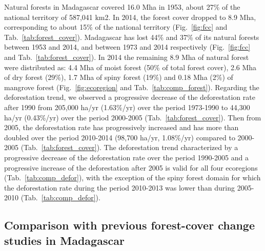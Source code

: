 \documentclass[a4paper, 12pt, leqno]{article} %
\begin{document}
Natural forests in Madagascar covered 16.0 Mha in 1953, about 27\% of
the national territory of 587,041 km2. In 2014, the forest cover
dropped to 8.9 Mha, corresponding to about 15\% of the national
territory (Fig.~\ref{fig:fcc} and
Tab.~\ref{tab:forest_cover}). Madagascar has lost 44\% and 37\% of its
natural forests between 1953 and 2014, and between 1973 and 2014
respectively (Fig.~\ref{fig:fcc} and Tab.~\ref{tab:forest_cover}). In
2014 the remaining 8.9 Mha of natural forest were distributed as: 4.4
Mha of moist forest (50\% of total forest cover), 2.6 Mha of dry
forest (29\%), 1.7 Mha of spiny forest (19\%) and 0.18 Mha (2\%) of
mangrove forest (Fig.~\ref{fig:ecoregion} and
Tab.~\ref{tab:comp_forest}). Regarding the deforestation trend, we
observed a progressive decrease of the deforestation rate after 1990
from 205,000 ha/yr (1.63\%/yr) over the period 1973-1990 to 44,300
ha/yr (0.43\%/yr) over the period 2000-2005
(Tab.~\ref{tab:forest_cover}). Then from 2005, the deforestation rate
has progressively increased and has more than doubled over the period
2010-2014 (98,700 ha/yr, 1.08\%/yr) compared to 2000-2005
(Tab.~\ref{tab:forest_cover}). The deforestation trend characterized
by a progressive decrease of the deforestation rate over the period
1990-2005 and a progressive increase of the deforestation after 2005
is valid for all four ecoregions (Tab.~\ref{tab:comp_defor}), with the
exception of the spiny forest domain for which the deforestation rate
during the period 2010-2013 was lower than during 2005-2010
(Tab.~\ref{tab:comp_defor}).

\subsection{Comparison with previous forest-cover change studies
in Madagascar}
\end{document}
